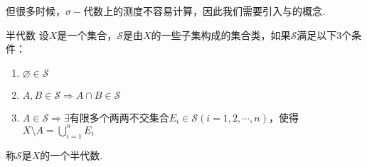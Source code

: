 但很多时候，$\sigma-\text{代数}$上的测度不容易计算，因此我们需要引入与的概念.
\begin{definition}{半代数}
    设$X$是一个集合，$\mathcal{S}$是由$X$的一些子集构成的集合类，如果$\mathcal{S}$满足以下3个条件：
    \begin{enumerate}
        \item $\varnothing\in\mathcal{S}$
        \item $A,B\in\mathcal{S}\Rightarrow A\cap B\in\mathcal{S}$
        \item $A\in\mathcal{S}\Rightarrow \exists\text{有限多个两两不交集合}E_i\in\mathcal{S}(i=1,2,\cdots,n)$，使得$X\setminus A=\bigcup_{i=1}^n{E_i}$
    \end{enumerate}
    称$\mathcal{S}$是$X$的一个半代数.
\end{definition}

